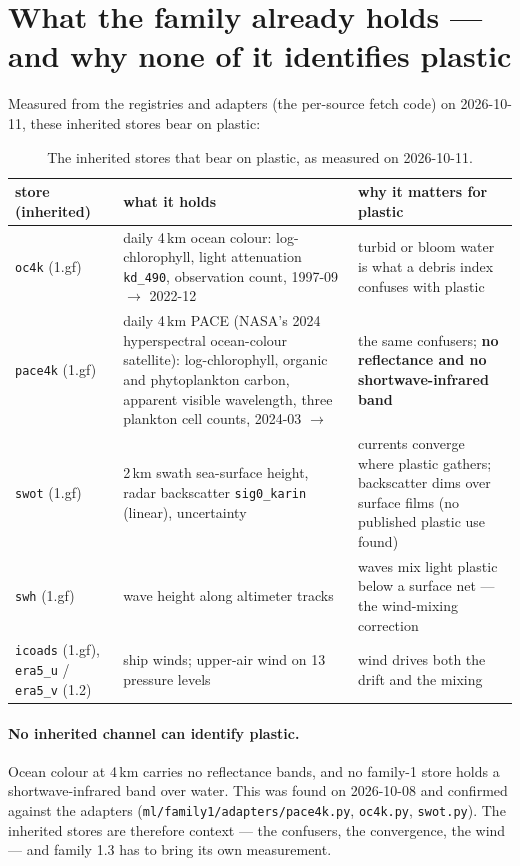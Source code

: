 \documentclass[10pt]{article}
\newcommand{\code}[1]{\texttt{#1}}
\begin{document}
\section{What the family already holds --- and why none of it identifies plastic}

Measured from the registries and adapters (the per-source fetch code) on 2026-10-11, these inherited stores bear
on plastic:

\begin{table}[h]
\centering\setlength{\tabcolsep}{4pt}\footnotesize
\begin{tabular}{@{}L{2.4cm}L{6.4cm}L{6.4cm}@{}}
\toprule
store (inherited) & what it holds & why it matters for plastic \\
\midrule
\code{oc4k} (1.gf) & daily 4\,km ocean colour: log-chlorophyll, light attenuation \code{kd\_490}, observation count,
1997-09 $\to$ 2022-12 & turbid or bloom water is what a debris index confuses with plastic \\
\addlinespace
\code{pace4k} (1.gf) & daily 4\,km PACE (NASA's 2024 hyperspectral ocean-colour satellite): log-chlorophyll,
organic and phytoplankton carbon, apparent visible wavelength, three plankton cell counts, 2024-03 $\to$ & the same
confusers; \textbf{no reflectance and no shortwave-infrared band} \\
\addlinespace
\code{swot} (1.gf) & 2\,km swath sea-surface height, radar backscatter \code{sig0\_karin} (linear), uncertainty &
currents converge where plastic gathers; backscatter dims over surface films (no published plastic use found) \\
\addlinespace
\code{swh} (1.gf) & wave height along altimeter tracks & waves mix light plastic below a surface net --- the
wind-mixing correction \\
\addlinespace
\code{icoads} (1.gf), \code{era5\_u} / \code{era5\_v} (1.2) & ship winds; upper-air wind on 13 pressure levels &
wind drives both the drift and the mixing \\
\bottomrule
\end{tabular}
\caption{The inherited stores that bear on plastic, as measured on 2026-10-11.}
\end{table}

\paragraph{No inherited channel can identify plastic.} Ocean colour at 4\,km carries no reflectance bands, and no
family-1 store holds a shortwave-infrared band over water. This was found on 2026-10-08 and confirmed against the
adapters (\code{ml/family1/adapters/pace4k.py}, \code{oc4k.py}, \code{swot.py}). The inherited stores are
therefore context --- the confusers, the convergence, the wind --- and family 1.3 has to bring its own measurement.
\end{document}
